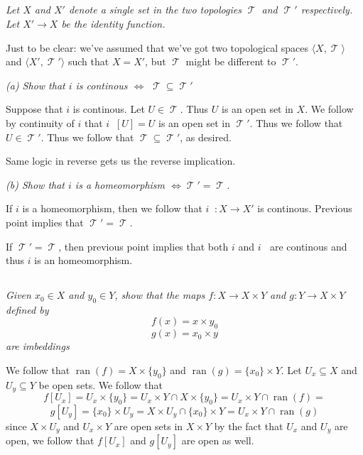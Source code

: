 \documentclass[11pt,oneside,titlepage]{book}
\DeclareMathOperator \topol {\mathcal {T}}
\DeclareMathOperator \inv {^{-1}}
\DeclareMathOperator \lra {\Leftrightarrow}
\DeclareMathOperator \ran {ran}
\newcommand{\eangle}[1]{\langle #1 \rangle}
\newcommand{\set}[1]{\{ #1 \}}
\begin{document}
\subsection{}

\textit{Let $X$ and $X'$ denote a single set in the two topologies $\topol$ and
  $\topol'$ respectively. Let $X' \to X$ be the identity function. }

Just to be clear: we've assumed that we've got two topological spaces
$\eangle{X, \topol}$ and $\eangle{X', \topol'}$ such that $X = X'$, but $\topol$
might be different to $\topol'$. 

\textit{(a) Show that $i$ is continous $\lra$ $\topol \subseteq \topol'$}

Suppose that $i$ is continous. Let $U \in \topol$.
Thus $U$ is an open set in $X$.
We follow by continuity of $i$ that $i\inv[U] = U$ is an open set in $\topol'$.
Thus we follow that $U \in \topol'$. Thus we follow that $\topol \subseteq \topol'$,
as desired.

Same logic in reverse gets us the reverse implication.

\textit{(b) Show that $i$ is a homeomorphism $\lra \topol' = \topol$.}

If $i$ is a homeomorphism, then we follow that $i\inv: X \to X'$ is continous.
Previous point implies that $\topol' = \topol$.

If $\topol' = \topol$, then previous point implies that both $i$ and $i\inv$ are
continous and thus $i$ is an homeomorphism.

\subsection{}

\textit{Given $x_0 \in X$ and $y_0 \in Y$, show that the maps $f: X \to X \times Y$
  and $g: Y \to X \times Y$ defined by
  $$f(x) = x \times y_0$$
  $$g(x) = x_0 \times y $$
  are imbeddings
}


We follow that $\ran(f) = X \times \set{y_0}$ and $\ran(g) = \set{x_0} \times Y$.
Let $U_x \subseteq X$ and $U_y \subseteq Y$ be open sets.
We follow that
$$f[U_x] = U_x \times \set{y_0} = U_x \times Y \cap X \times \set{y_0} =
U_x \times Y \cap \ran(f) = $$
$$g[U_y] = \set{x_0} \times U_y = X \times U_y  \cap \set{x_0} \times Y =
U_x \times Y \cap \ran(g)$$
since $X \times U_y$ and $U_x \times Y$ are open sets in $X \times Y$ by the fact that
$U_x$ and $U_y$ are open, we follow that $f[U_x]$ and $g[U_y]$ are open as well.
\end{document}
